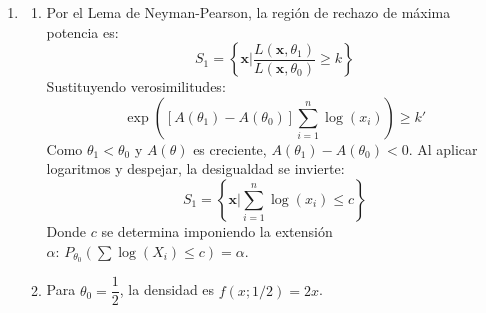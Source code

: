 \begin{enumerate}[label=\color{red}\textbf{\arabic*)}]
\begin{enumerate}[label=\color{red}\textbf{\alph*)}]
\begin{enumerate}[label=\arabic*)]
			                  El numerador bajo $H_0$ es evaluando $\theta=2:\,L(\mathbf{x},2)=2^{2n}\left( \prod x_{i} \right) \exp \left( -2\sum x_{i} \right).$ \[
				                  \lambda(\mathbf{x})=\dfrac{L(\mathbf{x};2)}{L(\mathbf{x};\hat{\theta})}=\dfrac{2^{2n}\exp(-2n\bar{x})}{\left( \frac{2}{\bar{x}}  \right) ^{2n}\exp(-2n)}=\bar{x}^{2n}\exp(-2n(\bar{x}-1))
			                  \]
			            \item Región de rechazo y extensión

			                  El test rechaza si $\lambda(\mathbf{x})<k$. La constante $k$ se determina por: \[
				                  P_{\theta=2}(\lambda(\mathbf{x})<k)=\alpha
			                  \]
		            \end{enumerate}
	      \end{enumerate}
	\item {}
	      \begin{enumerate}[label=\color{red}\textbf{\alph*)}]
		      \item {}

		            Por el Lema de Neyman-Pearson, la región de rechazo de máxima potencia es: \[
			            S_1=\left\{ \mathbf{x}\bigg| \dfrac{L(\mathbf{x},\theta_1)}{L(\mathbf{x},\theta_0)} \ge k\right\}
		            \]
		            Sustituyendo verosimilitudes: \[
			            \exp \left( [A(\theta_1)-A(\theta_0)]\sum_{i=1}^{n} \log(x_{i}) \right) \ge k'
		            \]
		            Como $\theta_1<\theta_0$ y $A(\theta)$ es creciente, $A(\theta_1)-A(\theta_0)<0$. Al aplicar logaritmos y despejar, la desigualdad se invierte: \[
			            S_1=\left\{ \mathbf{x}\bigg| \sum_{i=1}^{n} \log(x_{i})\le c \right\}
		            \]
		            Donde $c$ se determina imponiendo la extensión $\alpha:\, P_{\theta_0}\left( \sum \log(X_i)\le c \right)=\alpha$.
		      \item {}

		            Para $\theta_0=\dfrac{1}{2}$, la densidad es $f(x;1 / 2)=2x$.


\end{enumerate}
\end{enumerate}
